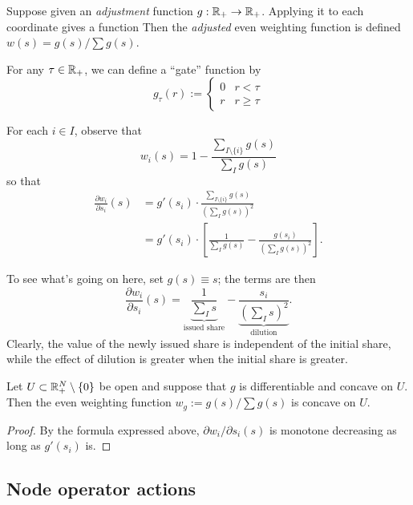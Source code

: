 \begin{example}

  Suppose given an \emph{adjustment} function $g:\mathbb{R}_+\rightarrow\mathbb{R}_+$. 
  Applying it to each coordinate gives a function
  Then the \emph{adjusted} even weighting function is defined $w(s) = g(s)/\sum g(s)$.

\end{example}

\begin{example}
  For any $\tau\in\mathbb{R}_+$, we can define a ``gate'' function by
  \[
    g_\tau(r) := \left\{\begin{array}{ll} 0 & r<\tau \\ r & r\geq\tau\end{array}\right.
  \]
\end{example}

For each $i\in I$, observe that
\[
  w_i(s) = 1 - \frac{\sum_{I\setminus\{i\}}g(s)}{\sum_I g(s)}
\]
so that
\begin{align*}
  \frac{\partial w_i}{\partial s_i}(s) &= g'(s_i)\cdot \frac{\sum_{I\setminus\{i\}}g(s)}{(\sum_I g(s))^2} \\
  &=g'(s_i)\cdot\left[ \frac{1}{\sum_I g(s)} - \frac{g(s_i)}{(\sum_I g(s))^2} \right].
\end{align*}

To see what's going on here, set $g(s)\equiv s$; the terms are then
\[
  \frac{\partial w_i}{\partial s_i}(s)=
  \underbrace{\frac{1}{\sum_I s}}_{\text{issued share}} - \underbrace{\frac{s_i}{(\sum_I s)^2}}_{\text{dilution}} .
\]
Clearly, the value of the newly issued share is independent of the initial share, while the effect of dilution is greater when the initial share is greater.

\begin{lemma}

  Let $U\subset \mathbb{R}_+^N\setminus\{0\}$ be open and suppose that $g$ is differentiable and concave on $U$.
  Then the even weighting function $w_g := g(s)/\sum g(s)$ is concave on $U$.

\end{lemma}
%
\begin{proof}

  By the formula expressed above, $\partial w_i/\partial s_i(s)$ is monotone decreasing as long as $g'(s_i)$ is. \qedhere

\end{proof}


\subsection{Node operator actions}

